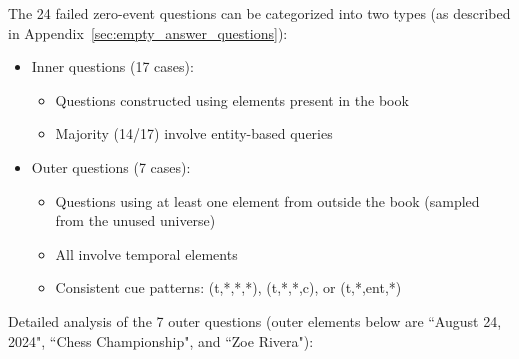 \documentclass{article}
\begin{document}
The 24 failed zero-event questions can be categorized into two types (as described in Appendix~\ref{sec:empty_answer_questions}):
\begin{itemize}
\item Inner questions (17 cases):
\begin{itemize}
\item Questions constructed using elements present in the book
\item Majority (14/17) involve entity-based queries
\end{itemize}
\item Outer questions (7 cases):
\begin{itemize}
\item Questions using at least one element from outside the book (sampled from the unused universe)
\item All involve temporal elements
\item Consistent cue patterns: (t,*,*,*), (t,*,*,c), or (t,*,ent,*)
\end{itemize}
\end{itemize}

Detailed analysis of the 7 outer questions (outer elements below are ``August 24, 2024", ``Chess Championship", and ``Zoe Rivera"):
\end{document}
